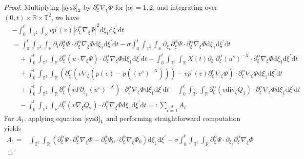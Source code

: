 \documentclass[10pt,reqno]{amsart}
\numberwithin{equation}{section}
\newcommand{\dif}{\mathrm{d}}
\newcommand{\ddiv}{\mathrm{div}}
\begin{document}
\begin{proof}
Multiplying $\eqref{sys3}_2$ by $\partial_\xi^\alpha\nabla_\xi\Phi$ for $|\alpha|=1, 2$, and integrating over $(0, t)\times\mathbb{R}\times\mathbb{T}^2$, we have
\begin{align*}
&-\int_0^t\int_{\mathbb{T}^2}\int_{\mathbb{R}}vp^\prime(v)|\partial_\xi^\alpha\nabla_\xi\Phi|^2
\dif \xi_1\dif \xi^{\prime}\dif t\\
&=\int_0^t\int_{\mathbb{T}^2}\int_{\mathbb{R}}\partial_t\partial_\xi^\alpha\Psi\cdot\partial_\xi^\alpha\nabla_\xi\Phi
\dif \xi_1\dif \xi^{\prime}\dif t
-\sigma\int_0^t\int_{\mathbb{T}^2}\int_{\mathbb{R}}\partial_{\xi_1}\partial_\xi^\alpha\Psi\cdot\partial_\xi^\alpha\nabla_\xi\Phi
\dif \xi_1\dif \xi^{\prime}\dif t\\
&\quad+\int_0^t\int_{\mathbb{T}^2}\int_{\mathbb{R}}\partial_\xi^\alpha\left( u\cdot\nabla_\xi\Psi\right)\cdot\partial_\xi^\alpha\nabla_\xi\Phi
\dif \xi_1\dif \xi^{\prime}\dif t
-\int_0^t\int_{\mathbb{T}^2}\int_{\mathbb{R}}\dot{X}(t)\partial_{\xi_1}\partial_\xi^\alpha(u^s)^{-X}\cdot\partial_\xi^\alpha\nabla_\xi\Phi
\dif \xi_1\dif \xi^{\prime}\dif t\\
&\quad+\int_0^t\int_{\mathbb{T}^2}\int_{\mathbb{R}}
\left(\partial_\xi^\alpha\left(v\nabla_\xi\left(p(v)-p((v^s)^{-X})\right)\right)-vp^\prime(v)\partial_\xi^\alpha\nabla_\xi\Phi\right)\cdot\partial_\xi^\alpha\nabla_\xi\Phi
\dif \xi_1\dif \xi^{\prime}\dif t\\
&\quad+\int_0^t\int_{\mathbb{T}^2}\int_{\mathbb{R}}\partial_\xi^\alpha\left(vF\partial_{\xi_1}(u^s)^{-X}\right)\cdot\partial_\xi^\alpha\nabla_\xi\Phi
\dif \xi_1\dif \xi^{\prime}\dif t
-\int_0^t\int_{\mathbb{T}^2}\int_{\mathbb{R}}\partial_\xi^\alpha\left(v\ddiv_\xi Q_1\right)\cdot\partial_\xi^\alpha\nabla_\xi\Phi
\dif \xi_1\dif \xi^{\prime}\dif t\\
&\quad
-\int_0^t\int_{\mathbb{T}^2}\int_{\mathbb{R}}\partial_\xi^\alpha\left(v\nabla_\xi Q_2\right)\cdot\partial_\xi^\alpha\nabla_\xi\Phi
\dif \xi_1\dif \xi^{\prime}\dif t=:\sum\limits_{i=1}\limits^8A_i.
\end{align*}
For $A_1$, applying equation $\eqref{sys3}_1$ and performing straightforward computation yields
\begin{align*}
A_1=&\int_{\mathbb{T}^2}\int_{\mathbb{R}}\left(\partial_\xi^\alpha\Psi\cdot\partial_\xi^\alpha\nabla_\xi\Phi
-\partial_\xi^\alpha\Psi_0\cdot\partial_\xi^\alpha\nabla_\xi\Phi_0\right)
\dif \xi_1\dif \xi^{\prime}
-\sigma\int_0^t\int_{\mathbb{T}^2}\int_{\mathbb{R}}
\partial_\xi^\alpha\Psi\cdot\partial_{\xi_1}\partial_\xi^\alpha\nabla_\xi\Phi

\end{align*}
\end{proof}
\end{document}
